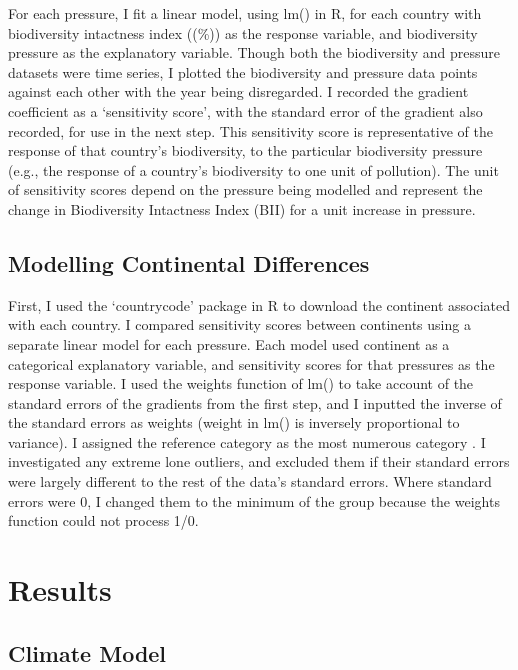 \documentclass[11pt, a4paper, titlepage]{article}
\begin{document}
	For each pressure, I fit a linear model, using lm() in R, for each country with biodiversity intactness index ((\%)) as the response variable, and biodiversity pressure as the explanatory variable. Though both the biodiversity and pressure datasets were time series, I plotted the biodiversity and pressure data points against each other with the year being disregarded. I recorded the gradient coefficient as a `sensitivity score', with the standard error of the gradient also recorded, for use in the next step. This sensitivity score is representative of the response of that country's biodiversity, to the particular biodiversity pressure (e.g., the response of a country's biodiversity to one unit of pollution). The unit of sensitivity scores depend on the pressure being modelled and represent the  change in Biodiversity Intactness Index (BII) for a unit increase in pressure. 

	\subsection*{Modelling Continental Differences}
	
	First, I used the `countrycode' package in R to download the continent associated with each country. I compared sensitivity scores between continents using a separate linear model for each pressure. Each model used continent as a categorical explanatory variable, and sensitivity scores for that pressures as the response variable. I used the weights function of lm() to take account of the standard errors of the gradients from the first step, and I inputted the inverse of the standard errors as weights (weight in lm() is inversely proportional to variance). I assigned the reference category as the most numerous category \citep{peng2014discrepancy}. I investigated any extreme lone outliers, and excluded them if their standard errors were largely different to the rest of the data's standard errors. Where standard errors were 0, I changed them to the minimum of the group because the weights function could not process 1/0.
	
	\clearpage

	\section*{Results}
	 
	\subsection*{Climate Model}
	
\end{document}
